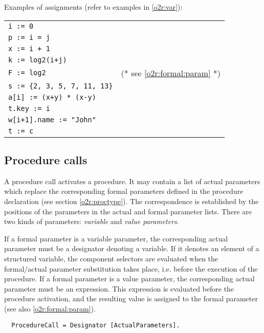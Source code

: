 \noindent
Examples of assignments (refer to examples in \ref{o2r:var}):
\begin{flushleft}
\begin{tabular}{ll}
\tt i :=  0                             \\
\tt p := i = j                          \\
\tt x := i + 1                          \\
\tt k := log2(i+j)                      \\
\tt F := log2                  & (* see \ref{o2r:formal:param} *) \\
\verb|s := {2, 3, 5, 7, 11, 13}|           \\
\tt a[i] := (x+y) * (x-y)               \\
\tt t.key := i                          \\
\tt w[i+1].name := "John"               \\
\tt t := c                              \\
\end{tabular}
\end{flushleft}

\subsection{ Procedure calls}

A procedure call activates a procedure. It may contain a list of actual
parameters which replace the corresponding formal parameters defined
in the procedure declaration (see section \ref{o2r:proctype}).
The correspondence is established by the positions of the parameters
in the actual and formal parameter lists. There are two kinds of parameters:
{\em variable} and {\em value parameters}.

        If a formal parameter is a variable parameter, the corresponding
actual parameter must be a designator denoting a variable. If it denotes
an element of a structured variable, the component selectors are evaluated
when the formal/actual parameter substitution takes place, i.e. before
the execution of the procedure. If a formal parameter is a value parameter,
the corresponding actual parameter must be an expression. This expression
is evaluated before the procedure activation, and the resulting value
is assigned to the formal parameter (see also \ref{o2r:formal:param}).
{\BNFsize
\begin{verbatim}
  ProcedureCall = Designator [ActualParameters].
\end{verbatim}}

